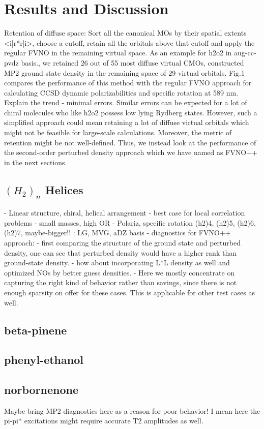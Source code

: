 \section{Results and Discussion}
Retention of diffuse space: Sort all the canonical MOs by their spatial
extents <i|r*r|i>, choose a cutoff, retain all the orbitals above that cutoff
and apply the regular FVNO in the remaining virtual space. As an example
for h2o2 in aug-cc-pvdz basis., we retained 26 out of 55 most diffuse virtual 
CMOs, constructed MP2 ground state density in the remaining space of 
29 virtual orbitals. Fig.1 compares the performance of this method 
with the regular FVNO approach for calculating CCSD dynamic polarizabilities
and specific rotation at 589 nm. Explain the trend - minimal errors. Similar
errors can be expected for a lot of chiral molecules who like h2o2 possess 
low lying Rydberg states. However, such a simplified approach could mean 
retaining a lot of diffuse virtual orbitals which might not be feasible 
for large-scale calculations. Moreover, the metric of retention might
be not well-defined. Thus, we instead look at the performance
of the second-order perturbed density approach which we have named as FVNO++ 
in the next sections.
\subsection{$(H_2)_n$ Helices}
- Linear structure, chiral, helical arrangement
- best case for local correlation problems
- small masses, high OR
- Polariz, specific rotation (h2)4, (h2)5, (h2)6, (h2)7, maybe-bigger!! : LG, MVG, aDZ basis
- diagnostics for FVNO++ approach:
	- first comparing the structure of the ground state and perturbed density, one can see 
	  that perturbed density would have a higher rank than ground-state density.
	- how about incorporating L*L density as well and optimized NOs by better guess densities.
	- Here we mostly concentrate on capturing the right kind of behavior rather 
  	than savings, since there is not enough sparsity on offer for these cases.
  	This is applicable for other test cases as well.
\subsection{beta-pinene}
\subsection{phenyl-ethanol}
\subsection{norbornenone}
Maybe bring MP2 diagnostics here as a reason for poor behavior! I mean here the pi-pi*
excitations might require accurate T2 amplitudes as well.
